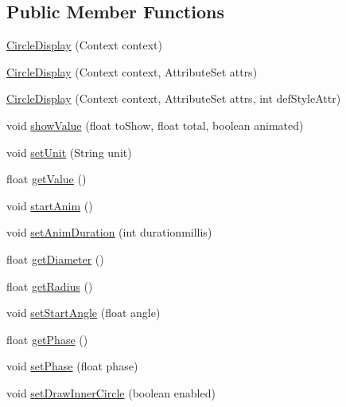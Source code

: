 \subsection*{Public Member Functions}
\begin{DoxyCompactItemize}
\item 
\hyperlink{classcs_1_1nsense_1_1_circle_display_adef51c888ebaf085b1f80ca6af4d3177}{Circle\-Display} (Context context)
\item 
\hyperlink{classcs_1_1nsense_1_1_circle_display_a26f7c986c58d1b602440f98ce6817808}{Circle\-Display} (Context context, Attribute\-Set attrs)
\item 
\hyperlink{classcs_1_1nsense_1_1_circle_display_ac64e517c9fd7d655ff5fe83e7e7caac2}{Circle\-Display} (Context context, Attribute\-Set attrs, int def\-Style\-Attr)
\item 
void \hyperlink{classcs_1_1nsense_1_1_circle_display_a359b57c9b613045cf09b1fcb8d10a627}{show\-Value} (float to\-Show, float total, boolean animated)
\item 
void \hyperlink{classcs_1_1nsense_1_1_circle_display_a0c5ad8b178592f830900e29d42904a8a}{set\-Unit} (String unit)
\item 
float \hyperlink{classcs_1_1nsense_1_1_circle_display_a04b2e7201369c7b223672951e1d0f3b8}{get\-Value} ()
\item 
void \hyperlink{classcs_1_1nsense_1_1_circle_display_a27586c0a3c228f547d664044dc516206}{start\-Anim} ()
\item 
void \hyperlink{classcs_1_1nsense_1_1_circle_display_a78c0e6167285f4e13e17b7e7456a1d11}{set\-Anim\-Duration} (int durationmillis)
\item 
float \hyperlink{classcs_1_1nsense_1_1_circle_display_ad4fd638235b5bfb2a4d104eff5b7cab3}{get\-Diameter} ()
\item 
float \hyperlink{classcs_1_1nsense_1_1_circle_display_ae301e2e2de98389ed156ae3a41bce47b}{get\-Radius} ()
\item 
void \hyperlink{classcs_1_1nsense_1_1_circle_display_a79f64b7423e43165689e4debb24ba0b4}{set\-Start\-Angle} (float angle)
\item 
float \hyperlink{classcs_1_1nsense_1_1_circle_display_ade1ee19bd66715f6e1cccd291ffa4d5e}{get\-Phase} ()
\item 
void \hyperlink{classcs_1_1nsense_1_1_circle_display_a3ef926a894735d3e220380c8030f79d0}{set\-Phase} (float phase)
\item 
void \hyperlink{classcs_1_1nsense_1_1_circle_display_abb2de71a5cdc6e6096d7b852286e74e7}{set\-Draw\-Inner\-Circle} (boolean enabled)

\end{DoxyCompactItemize}
